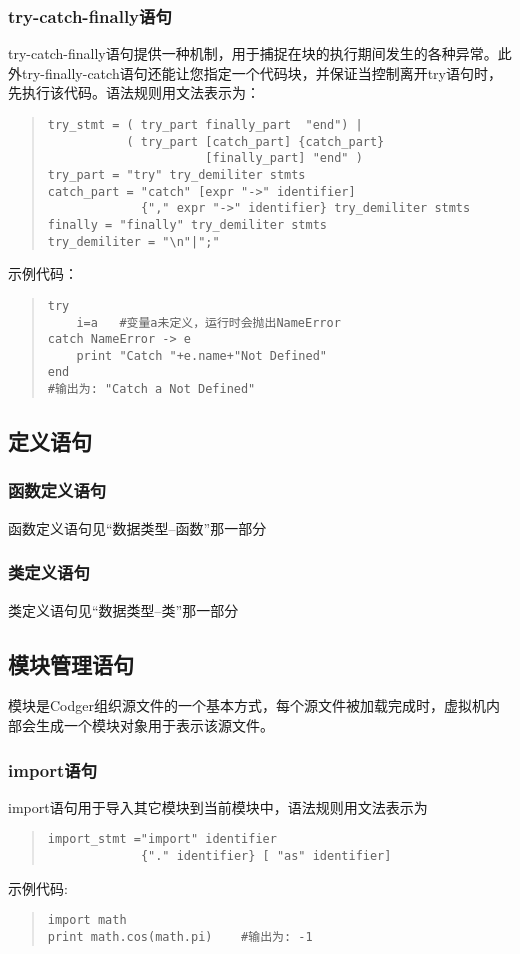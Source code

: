 \subsubsection{try-catch-finally语句}
try-catch-finally语句提供一种机制，用于捕捉在块的执行期间发生的各种异常。此外try-finally-catch语句还能让您指定一个代码块，并保证当控制离开try语句时，先执行该代码。语法规则用文法表示为：
\begin{quote}
\begin{verbatim}
try_stmt = ( try_part finally_part  "end") |
           ( try_part [catch_part] {catch_part} 
                      [finally_part] "end" )
try_part = "try" try_demiliter stmts
catch_part = "catch" [expr "->" identifier] 
             {"," expr "->" identifier} try_demiliter stmts
finally = "finally" try_demiliter stmts
try_demiliter = "\n"|";"
\end{verbatim}
\end{quote}
示例代码：
\begin{quote}
\begin{verbatim}
try 
    i=a   #变量a未定义，运行时会抛出NameError
catch NameError -> e
    print "Catch "+e.name+"Not Defined"
end 
#输出为: "Catch a Not Defined"
\end{verbatim}

\end{quote}


\subsection{定义语句}
\subsubsection{函数定义语句}
函数定义语句见``数据类型--函数''那一部分
\subsubsection{类定义语句}
类定义语句见``数据类型--类''那一部分

\subsection{模块管理语句}
模块是Codger组织源文件的一个基本方式，每个源文件被加载完成时，虚拟机内部会生成一个模块对象用于表示该源文件。
\subsubsection{import语句}
import语句用于导入其它模块到当前模块中，语法规则用文法表示为
\begin{quote}
\begin{verbatim}
import_stmt ="import" identifier 
             {"." identifier} [ "as" identifier]
\end{verbatim}
\end{quote}
示例代码:
\begin{quote}
\begin{verbatim}
import math
print math.cos(math.pi)    #输出为: -1
\end{verbatim}
\end{quote}
